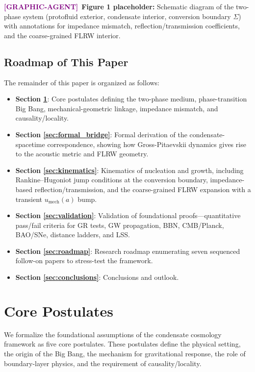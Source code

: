 \documentclass[11pt,a4paper]{article}
\newcommand{\umech}{u_{\mathrm{mech}}}
\theoremstyle{definition}
\newcommand{\GRAPHAGENT}{\textcolor{purple}{\textbf{[GRAPHIC-AGENT]}}}
\begin{document}
\GRAPHAGENT~\textbf{Figure 1 placeholder:} Schematic diagram of the two-phase system (protofluid exterior, condensate interior, conversion boundary $\Sigma$) with annotations for impedance mismatch, reflection/transmission coefficients, and the coarse-grained FLRW interior.

\subsection{Roadmap of This Paper}
\label{sec:roadmap_intro}

The remainder of this paper is organized as follows:
\begin{itemize}[leftmargin=1.8em]
  \item \textbf{Section \ref{sec:postulates}}: Core postulates defining the two-phase medium, phase-transition Big Bang, mechanical-geometric linkage, impedance mismatch, and causality/locality.
  \item \textbf{Section \ref{sec:formal_bridge}}: Formal derivation of the condensate-spacetime correspondence, showing how Gross-Pitaevskii dynamics gives rise to the acoustic metric and FLRW geometry.
  \item \textbf{Section \ref{sec:kinematics}}: Kinematics of nucleation and growth, including Rankine--Hugoniot jump conditions at the conversion boundary, impedance-based reflection/transmission, and the coarse-grained FLRW expansion with a transient $\umech(a)$ bump.
  \item \textbf{Section \ref{sec:validation}}: Validation of foundational proofs---quantitative pass/fail criteria for GR tests, GW propagation, BBN, CMB/Planck, BAO/SNe, distance ladders, and LSS.
  \item \textbf{Section \ref{sec:roadmap}}: Research roadmap enumerating seven sequenced follow-on papers to stress-test the framework.
  \item \textbf{Section \ref{sec:conclusions}}: Conclusions and outlook.
\end{itemize}

\section{Core Postulates}
\label{sec:postulates}

We formalize the foundational assumptions of the condensate cosmology framework as five core postulates. These postulates define the physical setting, the origin of the Big Bang, the mechanism for gravitational response, the role of boundary-layer physics, and the requirement of causality/locality.
\end{document}
